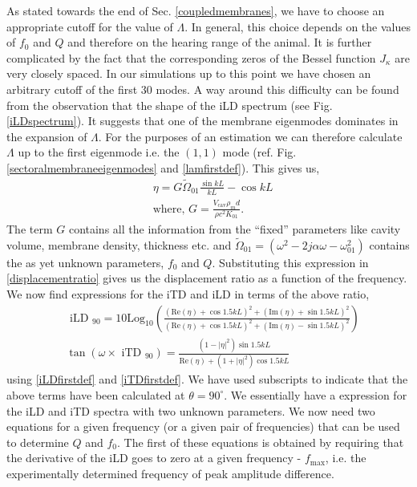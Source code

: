 As stated towards the end
of Sec. \ref{coupledmembranes}, we have to choose an appropriate cutoff for the value of $\Lambda$. In general, this choice
depends on the values of $f_0$ and $Q$ and therefore on the hearing range of the animal. It is further complicated by
the fact that the corresponding zeros of the Bessel function $J_\kappa$ are very closely spaced. In our simulations up to this point
we have chosen an arbitrary cutoff of the first $30$ modes. A way around this difficulty can be found from the observation that the shape
of the iLD spectrum (see Fig. \ref{iLDspectrum}). It suggests that one of the membrane eigenmodes dominates in the expansion of $\Lambda$. 
For the purposes of an estimation 
we can therefore calculate $\Lambda$ up to the first eigenmode i.e. the $(1,1)$ mode (ref. Fig. \ref{sectoralmembraneeigenmodes} and \eqref{lamfirstdef}).
This gives us,
\begin{align}
 &\eta=G\widetilde{\Omega}_{01}\frac{\sin kL}{kL}-\cos kL\\
 &\mbox{where, }G=\frac{V_{\mathrm{\mathrm{cav}}}\rho_md}{\rho c^2 K_{01}}\nonumber.
\end{align}
The term $G$ contains all the information from the ``fixed'' parameters like cavity volume, membrane density, thickness etc. and
$\widetilde{\Omega}_{01}=(\omega^2-2j\alpha\omega-\omega^2_{01})$ contains the as yet unknown parameters, $f_0$ and $Q$. Substituting
this expression in \eqref{displacementratio} gives us the displacement ratio as a function of the frequency. 
We now find expressions for the iTD and iLD in terms of the above ratio,
\begin{align}
 &\mbox{ iLD }_{90}= 10\mbox{Log}_{10}\left(\frac{(\mbox{Re}(\eta)+\cos 1.5kL)^2+(\mbox{Im}(\eta)+\sin 1.5kL)^2}{(\mbox{Re}(\eta)+\cos 1.5kL)^2+(\mbox{Im}(\eta)-\sin 1.5kL)^2}\right)\label{iLDnewdef}\\
 &\tan\left(\omega\times\mbox{ iTD }_{90}\right)= \frac{(1-|\eta|^2)\sin 1.5kL}{\mbox{Re}(\eta)+(1+|\eta|^2)\cos 1.5kL}\label{iTDnewdef}
\end{align}
using \eqref{iLDfirstdef} and \eqref{iTDfirstdef}. We have used subscripts to indicate that the above terms have been calculated
at $\theta = 90^\circ$. We essentially have 
a expression for the iLD and iTD spectra with two unknown parameters. We now need two equations for a given frequency (or a given
pair of frequencies) that can be used to determine $Q$ and $f_0$. The first of these equations is obtained by requiring that
the derivative of the iLD goes to zero at a given frequency - $f_{\mathrm{max}}$, i.e. the experimentally determined frequency of 
peak amplitude difference.


